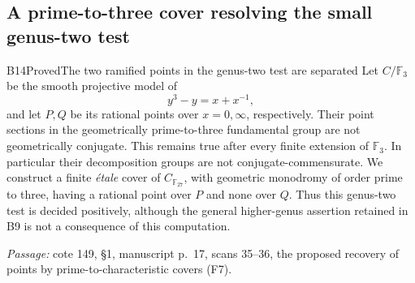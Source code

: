 \subsection{A prime-to-three cover resolving the small genus-two test}

\begin{result}{B14}{Proved}{The two ramified points in the genus-two test are separated}
Let $C/\mathbb F_3$ be the smooth projective model of
\[
                 y^3-y=x+x^{-1},
\]
and let $P,Q$ be its rational points over $x=0,\infty$, respectively.
Their point sections in the geometrically prime-to-three fundamental
group are not geometrically conjugate. This remains true after every
finite extension of $\mathbb F_3$. In particular their decomposition
groups are not conjugate-commensurate. We construct a finite \emph{\'etale}
cover of $C_{\mathbb F_{27}}$, with geometric monodromy of order prime
to three, having a rational point over $P$ and none over $Q$.
Thus this genus-two test is decided positively, although the
general higher-genus assertion retained in B9 is not a consequence
of this computation.
\par\emph{Passage:} cote 149, \S1, manuscript p.~17, scans 35--36,
the proposed recovery of points by prime-to-characteristic covers (F7).
\end{result}

